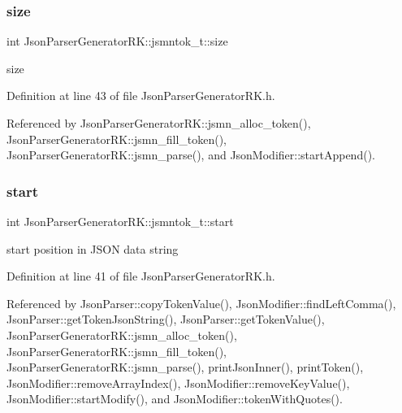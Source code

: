 \subsubsection{\texorpdfstring{size}{size}}
{\footnotesize\ttfamily int Json\+Parser\+Generator\+R\+K\+::jsmntok\+\_\+t\+::size}



size 



Definition at line 43 of file Json\+Parser\+Generator\+R\+K.\+h.



Referenced by Json\+Parser\+Generator\+R\+K\+::jsmn\+\_\+alloc\+\_\+token(), Json\+Parser\+Generator\+R\+K\+::jsmn\+\_\+fill\+\_\+token(), Json\+Parser\+Generator\+R\+K\+::jsmn\+\_\+parse(), and Json\+Modifier\+::start\+Append().

\mbox{\label{struct_json_parser_generator_r_k_1_1jsmntok__t_a4fb68e88a6a7c366289a92c8b1332f4f}} 
\subsubsection{\texorpdfstring{start}{start}}
{\footnotesize\ttfamily int Json\+Parser\+Generator\+R\+K\+::jsmntok\+\_\+t\+::start}



start position in J\+S\+ON data string 



Definition at line 41 of file Json\+Parser\+Generator\+R\+K.\+h.



Referenced by Json\+Parser\+::copy\+Token\+Value(), Json\+Modifier\+::find\+Left\+Comma(), Json\+Parser\+::get\+Token\+Json\+String(), Json\+Parser\+::get\+Token\+Value(), Json\+Parser\+Generator\+R\+K\+::jsmn\+\_\+alloc\+\_\+token(), Json\+Parser\+Generator\+R\+K\+::jsmn\+\_\+fill\+\_\+token(), Json\+Parser\+Generator\+R\+K\+::jsmn\+\_\+parse(), print\+Json\+Inner(), print\+Token(), Json\+Modifier\+::remove\+Array\+Index(), Json\+Modifier\+::remove\+Key\+Value(), Json\+Modifier\+::start\+Modify(), and Json\+Modifier\+::token\+With\+Quotes().

\mbox{\label{struct_json_parser_generator_r_k_1_1jsmntok__t_af74f112dd9655aaa8da0a91e7c8f3495}} 
